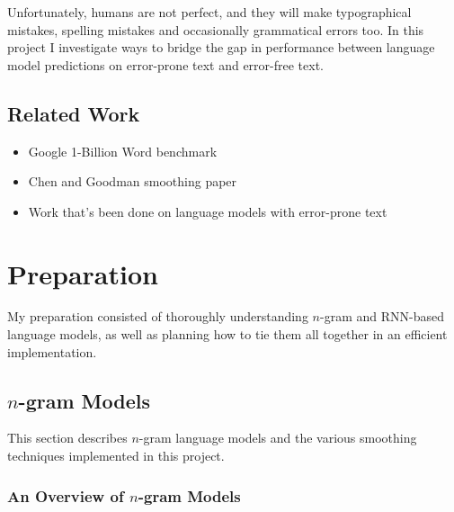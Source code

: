 \documentclass[a4paper, 12pt]{report}
\begin{document}
Unfortunately, humans are not perfect, and they will make typographical mistakes, spelling mistakes and occasionally grammatical errors too. In this project I investigate ways to bridge the gap in performance between language model predictions on error-prone text and error-free text. 

\section{Related Work}
\begin{itemize}
\item
	Google 1-Billion Word benchmark
\item
	Chen and Goodman smoothing paper
\item
	Work that's been done on language models with error-prone text 
\end{itemize}

\chapter{Preparation}

My preparation consisted of thoroughly understanding $n$-gram and RNN-based language models, as well as planning how to tie them all together in an efficient implementation.

\section{$n$-gram Models}

This section describes $n$-gram language models and the various smoothing techniques implemented in this project.

\subsection{An Overview of $n$-gram Models}
\end{document}
